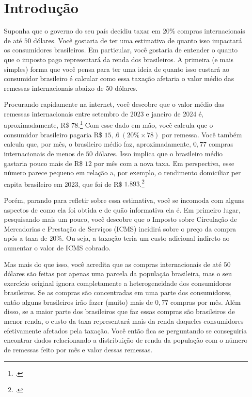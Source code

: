 \documentclass[12pt, a4paper, openany]{book}
\numberwithin{equation}{chapter}
\numberwithin{table}{chapter}
\numberwithin{figure}{chapter}
\theoremstyle{break}
\begin{document}
\tableofcontents
\newpage


\mainmatter

\chapter{Introdução}
\label{sec:introducao}

Suponha que o governo do seu país decidiu taxar em $20\%$ compras internacionais de até $50$ dólares. Você gostaria de ter uma estimativa de quanto isso impactará os consumidores brasileiros. Em particular, você gostaria de entender o quanto que o imposto pago representará da renda dos brasileiros. A primeira (e mais simples) forma que você pensa para ter uma ideia de quanto isso custará ao consumidor brasileiro é calcular como essa taxação afetaria o valor médio das remessas internacionais abaixo de $50$ dólares. 

Procurando rapidamente na internet, você descobre que o valor médio das remessas internacionais entre setembro de 2023 e janeiro de 2024 é, aproximadamente, R\$ $78$.\footnote{\textcite{folha_remessas}.} Com esse dado em mão, você calcula que o consumidor brasileiro pagaria R\$ $15,.6 \ (20\% \times 78)$ por remessa. Você também calcula que, por mês, o brasileiro médio faz, aproximadamente, $0,77$ compras internacionais de menos de $50$ dólares. Isso implica que o brasileiro médio gastaria pouco mais de R\$ $12$ por mês com a nova taxa. Em perspectiva, esse número parece pequeno em relação a, por exemplo, o rendimento domiciliar per capita brasileiro em 2023, que foi de R\$ $1.893$.\footnote{\textcite{poder360rendadomiciliar}.}

Porém, parando para refletir sobre essa estimativa, você se incomoda com alguns aspectos de como ela foi obtida e de quão informativa ela é. Em primeiro lugar, pesquisando  mais um pouco, você descobre que o Imposto sobre Circulação de Mercadorias e Prestação de Serviços (ICMS) incidirá sobre o preço da compra após a taxa de $20\%$. Ou seja, a taxação teria um custo adicional indireto ao aumentar o valor de ICMS cobrado. 

Mas mais do que isso, você acredita que as compras internacionais de até $50$ dólares são feitas por apenas uma parcela da população brasileira, mas o seu exercício original ignora completamente a heterogeneidade dos consumidores brasileiros. Se as compras são concentradas em uma parte dos consumidores, então alguns brasileiros irão fazer (muito) mais de $0,77$ compras por mês. Além disso, se a maior parte dos brasileiros que faz essas compras são brasileiros de menor renda, o custo da taxa representará mais da renda daqueles consumidores efetivamente afetados pela taxação. Você então fica se perguntando se conseguiria encontrar dados relacionando a distribuição de renda da população com o número de remessas feito por mês e valor dessas remessas. 
\end{document}
